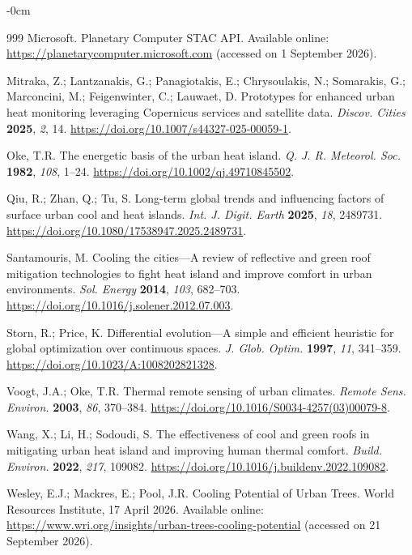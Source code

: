 \documentclass[remotesensing,article,submit,oneauthor]{Definitions/mdpi}
\begin{document}
\begin{adjustwidth}{-\extralength}{0cm}
{\begin{thebibliography}{999}
Microsoft. Planetary Computer STAC API. Available online:
\url{https://planetarycomputer.microsoft.com} (accessed on 1 September
2026).

Mitraka, Z.; Lantzanakis, G.; Panagiotakis, E.; Chrysoulakis, N.;
Somarakis, G.; Marconcini, M.; Feigenwinter, C.; Lauwaet, D. Prototypes
for enhanced urban heat monitoring leveraging Copernicus services and
satellite data. \textit{Discov. Cities} \textbf{2025}, \textit{2}, 14.
\url{https://doi.org/10.1007/s44327-025-00059-1}.

Oke, T.R. The energetic basis of the urban heat island. \textit{Q. J. R.
Meteorol. Soc.} \textbf{1982}, \textit{108}, 1--24.
\url{https://doi.org/10.1002/qj.49710845502}.

Qiu, R.; Zhan, Q.; Tu, S. Long-term global trends and influencing factors
of surface urban cool and heat islands. \textit{Int. J. Digit. Earth}
\textbf{2025}, \textit{18}, 2489731.
\url{https://doi.org/10.1080/17538947.2025.2489731}.

Santamouris, M. Cooling the cities---A review of reflective and green
roof mitigation technologies to fight heat island and improve comfort in
urban environments. \textit{Sol. Energy} \textbf{2014}, \textit{103},
682--703. \url{https://doi.org/10.1016/j.solener.2012.07.003}.

Storn, R.; Price, K. Differential evolution---A simple and efficient
heuristic for global optimization over continuous spaces.
\textit{J. Glob. Optim.} \textbf{1997}, \textit{11}, 341--359.
\url{https://doi.org/10.1023/A:1008202821328}.

Voogt, J.A.; Oke, T.R. Thermal remote sensing of urban climates.
\textit{Remote Sens. Environ.} \textbf{2003}, \textit{86}, 370--384.
\url{https://doi.org/10.1016/S0034-4257(03)00079-8}.

Wang, X.; Li, H.; Sodoudi, S. The effectiveness of cool and green roofs in
mitigating urban heat island and improving human thermal comfort.
\textit{Build. Environ.} \textbf{2022}, \textit{217}, 109082.
\url{https://doi.org/10.1016/j.buildenv.2022.109082}.

Wesley, E.J.; Mackres, E.; Pool, J.R. Cooling Potential of Urban Trees.
World Resources Institute, 17 April 2026. Available online:
\url{https://www.wri.org/insights/urban-trees-cooling-potential}
(accessed on 21 September 2026).


\end{thebibliography}}
\end{adjustwidth}
\end{document}
